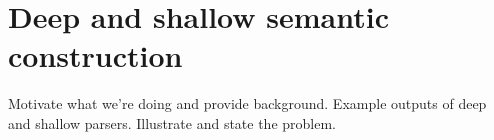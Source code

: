\section{Deep and shallow semantic construction}
\label{sec:motivation}

Motivate what we're doing and provide background.  Example outputs of
deep and shallow parsers.  Illustrate and state the problem.


